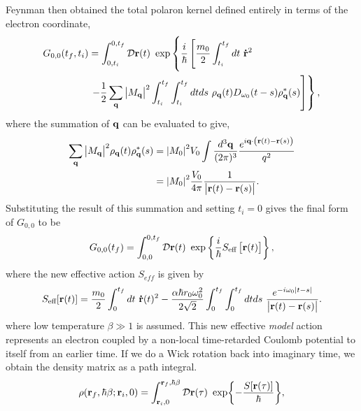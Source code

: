 Feynman then obtained the total polaron kernel defined entirely in terms of the electron coordinate,
\begin{equation}
\begin{aligned}
    G_{0,0}(t_f, t_i) &= \int^{0, t_f}_{0, t_i} \mathcal{D}\vb{r}(t)\ \exp\left\{ \frac{i}{\hbar} \left[  \frac{m_0}{2} \int^{t_f}_{t_i} dt\ \vb{\dot{r}}^2 \right.\right. \\
    &\left.\left.- \frac{1}{2} \sum_{\vb{q}} \abs{M_{\vb{q}}}^2 \int_{t_i}^{t_f} \int_{t_i}^{t_f} dt ds\  \rho_{\vb{q}}(t) D_{\omega_0}(t-s) \rho^*_{\vb{q}}(s) \right] \right\},
\end{aligned}
\label{eqn-2211-8}
\end{equation}
where the summation of $\vb{q}$ can be evaluated to give,
\begin{equation}
\begin{aligned}
    \sum_{\vb{q}} \abs{M_{\vb{q}}}^2 \rho_{\vb{q}}(t) \rho^*_{\vb{q}}(s) &= \abs{M_{0}}^2 V_0 \int \frac{d^3\vb{q}}{(2\pi)^3} \frac{e^{i\vb{q}\cdot \left(\vb{r}(t) - \vb{r}(s) \right)}}{q^2} \\
    &= \abs{M_{0}}^2 \frac{V_0}{4\pi} \frac{1}{\abs{\vb{r}(t) - \vb{r}(s)}}.
\end{aligned}
\label{eqn-2211-9}
\end{equation}
Substituting the result of this summation and setting $t_i = 0$ gives the final form of $G_{0,0}$ to be
\begin{equation}
    G_{0,0}(t_f) = \int^{0, t_f}_{0, 0} \mathcal{D}\vb{r}(t)\ \exp\left\{ \frac{i}{\hbar} S_{\text{eff}} \left[\vb{r}(t)\right] \right\},
\label{eqn-2211-10}
\end{equation}
where the new effective action $S_{eff}$ is given by
\begin{equation}
     S_{\text{eff}}[\vb{r}(t)] = \frac{m_0}{2} \int^{t_f}_{0} dt\ \vb{\dot{r}}(t)^2 -\frac{\alpha \hbar r_0 \omega_0^2}{2\sqrt{2}} \int_{0}^{t_f} \int_{0}^{t_f} dt ds\ \frac{e^{-i\omega_0\abs{t-s}}}{\abs{\vb{r}(t) - \vb{r}(s)}}.
\label{eqn-2211-11}
\end{equation}
where low temperature $\beta \gg 1$ is assumed. This new effective \emph{model} action represents an electron coupled by a non-local time-retarded Coulomb potential to itself from an earlier time. If we do a Wick rotation back into imaginary time, we obtain the density matrix as a path integral.
\begin{equation}
    \rho(\vb{r}_{f}, \hbar\beta; \vb{r}_{i}, 0) = \int_{\vb{r}_i, 0}^{\vb{r}_f, \hbar\beta} \mathcal{D} \vb{r}(\tau)\ \exp{-\frac{S[\mathbf{r}(\tau)]}{\hbar}},
\label{eqn-2211-12:path_density}
\end{equation}
